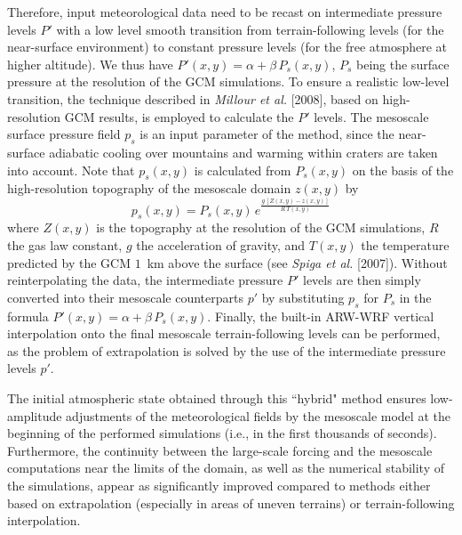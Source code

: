 \sk
Therefore, input meteorological data need to be recast on intermediate pressure levels $P'$ with a low level smooth transition from terrain-following levels (for the near-surface environment) to constant pressure levels (for the free atmosphere at higher altitude). We thus have $P'(x,y)=\alpha + \beta \, P_s(x,y)$, $P_s$ being the surface pressure at the resolution of the GCM simulations. To ensure a realistic low-level transition, the technique described in \textit{Millour et al.} [2008]\nocite{Mill:08ddd}, based on high-resolution GCM results, is employed to calculate the $P'$ levels. The mesoscale surface pressure field $p_s$ is an input parameter of the method, since the near-surface adiabatic cooling over mountains and warming within craters are taken into account. Note that $p_s(x,y)$ is calculated from $P_s(x,y)$ on the basis of the high-resolution topography of the mesoscale domain $z(x,y)$ by $$p_s(x,y) = P_s(x,y) \, e^{ \frac{g \, [Z(x,y)-z(x,y)]}{R \, T(x,y)} }$$ \noindent where $Z(x,y)$ is the topography at the resolution of the GCM simulations, $R$ the gas law constant, $g$ the acceleration of gravity, and $T(x,y)$ the temperature predicted by the GCM $1$~km above the surface (see \textit{Spiga et al.} [2007]\nocite{Spig:07omeg}). Without reinterpolating the data, the intermediate pressure $P'$ levels are then simply converted into their mesoscale counterparts $p'$ by substituting $p_s$ for $P_s$ in the formula $P'(x,y)=\alpha + \beta \, P_s(x,y)$. Finally, the built-in ARW-WRF vertical interpolation onto the final mesoscale terrain-following levels can be performed, as the problem of extrapolation is solved by the use of the intermediate pressure levels $p'$.

\sk
The initial atmospheric state obtained through this ``hybrid" method ensures low-amplitude adjustments of the meteorological fields by the mesoscale model at the beginning of the performed simulations (i.e., in the first thousands of seconds). Furthermore, the continuity between the large-scale forcing and the mesoscale computations near the limits of the domain, as well as the numerical stability of the simulations, appear as significantly improved compared to methods either based on extrapolation (especially in areas of uneven terrains) or terrain-following interpolation.

%
\clearemptydoublepage

